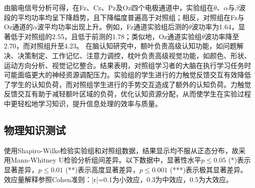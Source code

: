 \documentclass[runningheads]{llncs}
\begin{document}

由脑电信号分析可得，在Fz、Cz、Pz及Oz四个电极通道中，实验组在$\theta$、$\alpha$与$\beta$波段的平均功率均呈下降趋势，且下降幅度普遍高于对照组；相反，对照组在Fz与Oz通道的$\alpha$波平均功率出现上升。例如，Fz通道实验组后测的$\theta$波功率为1.64，显著低于对照组的2.55，且低于前测的1.78；类似地，Oz通道实验组$\theta$波功率降至2.70，而对照组升至4.23。
在脑认知研究中，额叶负责高级认知功能，如问题解决、决策制定、工作记忆、注意力调控，枕叶负责高级视觉功能，如颜色、形状、运动方向分析、视觉记忆整合\cite{kolb2009fundamentals}。结果表明，对照组学习者的大脑在执行学习任务时可能面临更大的神经资源调配压力。实验组的学生进行的力触觉反馈交互有效降低了学生的认知负荷，而对照组学生进行的手势交互造成了额外的认知负荷。力触觉反馈交互有助于减轻额叶区域的负荷，优化认知资源分配，从而使学生在实验过程中更轻松地学习知识，提升信息处理的效率与质量。

\subsection{物理知识测试}
使用Shapiro-Wilks检验实验组和对照组数据，结果显示均不服从正态分布，故采用Mann-Whitney U检验分析组间差异。以下数据中，显著性水平$p \le 0.05$ (*)表示显著差异，$p \le 0.01$ (**)表示高度显著差异，$p \le 0.001$ (***)表示极其显著差异。效应量解释参照Cohen准则：|r|=0.1为小效应，0.3为中效应，0.5为大效应。
\end{document}
